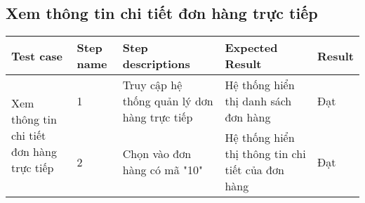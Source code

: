 \subsection{ Xem thông tin chi tiết đơn hàng trực tiếp}
{
    \setlength\extrarowheight{6pt}
    \begin{longtable}{| p{2.5cm}| p{1cm}| p{5.5cm}| p{4.5cm} | p{1.5cm} |}
        \hline
        \textbf{Test case} & \textbf{Step name} & \textbf{Step descriptions} & \textbf{Expected Result} & \textbf{Result} \\
        \hline
        \multirow[t]{2}{2.5cm}{ Xem thông tin chi tiết đơn hàng trực tiếp} & 1 & Truy cập hệ thống quản lý dơn hàng trực tiếp & Hệ thống hiển thị danh sách đơn hàng & Đạt \\
        \cline{2-5}
         & 2 & Chọn vào đơn hàng có mã "10" & Hệ thống hiển thị thông tin chi tiết của đơn hàng& Đạt \\
         \hline
    \end{longtable}
}